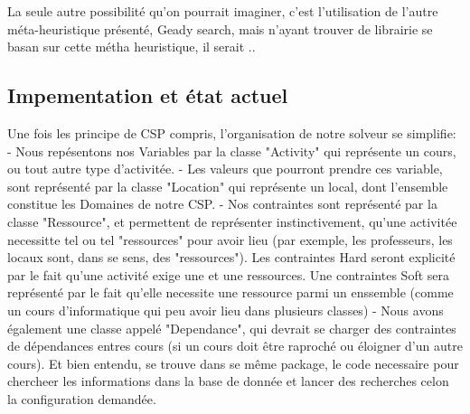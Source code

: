 La seule autre possibilité qu'on pourrait imaginer, c'est l'utilisation de l'autre méta-heuristique présenté, Geady search, mais n'ayant trouver de librairie se basan sur cette métha heuristique, il serait .. %


\subsection{Impementation et état actuel}
Une fois les principe de CSP compris, l'organisation de notre solveur se simplifie: 
- Nous repésentons nos Variables par la classe "Activity" qui représente un cours, ou tout autre type d'activitée.\newline
- Les valeurs que pourront prendre ces variable, sont représenté par la classe "Location" qui représente un local, dont l'ensemble constitue les Domaines de notre CSP.\newline
- Nos contraintes sont représenté par la classe "Ressource", et permettent de représenter instinctivement, qu'une activitée necessitte tel ou tel "ressources" pour avoir lieu (par exemple, les professeurs, les locaux sont, dans se sens, des "ressources"). Les contraintes Hard seront explicité par le fait qu'une activité exige une et une ressources. Une contraintes Soft sera représenté par le fait qu'elle necessite une ressource parmi un enssemble (comme un cours d'informatique qui peu avoir lieu dans plusieurs classes) \newline
- Nous avons également une classe appelé "Dependance", qui devrait se charger des contraintes de dépendances entres cours (si un cours doit être raproché ou éloigner d'un autre cours). \newline
Et bien entendu, se trouve dans se même package, le code necessaire pour chercheer les informations dans la base de donnée et lancer des recherches celon la configuration demandée.

\indent

